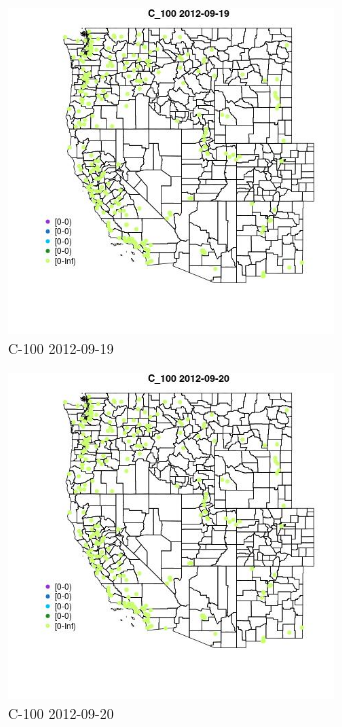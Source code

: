 \begin{figure} 
\centering  
\includegraphics[width=0.77\textwidth]{Code_Outputs/ML_input_report_ML_input_PM25_Step5_part_d_de_duplicated_aves_ML_input_MapObsC_1002012-09-19.jpg} 
\caption{\label{fig:ML_input_report_ML_input_PM25_Step5_part_d_de_duplicated_aves_ML_inputMapObsC_1002012-09-19}C-100 2012-09-19} 
\end{figure} 
 

\begin{figure} 
\centering  
\includegraphics[width=0.77\textwidth]{Code_Outputs/ML_input_report_ML_input_PM25_Step5_part_d_de_duplicated_aves_ML_input_MapObsC_1002012-09-20.jpg} 
\caption{\label{fig:ML_input_report_ML_input_PM25_Step5_part_d_de_duplicated_aves_ML_inputMapObsC_1002012-09-20}C-100 2012-09-20} 
\end{figure} 
 

